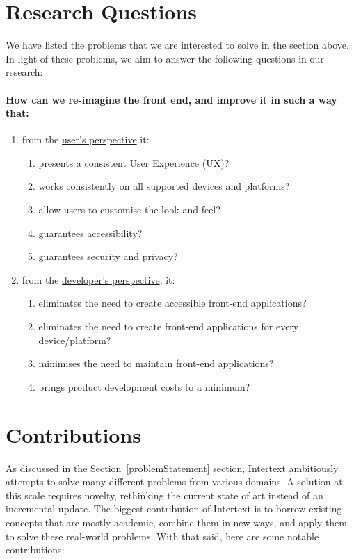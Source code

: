 \section{Research Questions} \label{researchQuestions}

We have listed the problems that we are interested to solve in the section above. In light of these problems, we aim to answer the following questions in our research:

\paragraph{How can we re-imagine the front end, and improve it in such a way that:}
\begin{enumerate}
  \item from the \underline{user's perspective} it:
  \begin{enumerate}
    \item presents a consistent User Experience (UX)?
    \item works consistently on all supported devices and platforms?
    \item allow users to customise the look and feel?
    \item guarantees accessibility?
    \item guarantees security and privacy?
  \end{enumerate}
  \item from the \underline{developer's perspective}, it:
  \begin{enumerate}
    \item eliminates the need to create accessible front-end applications?
    \item eliminates the need to create front-end applications for every device/platform?
    \item minimises the need to maintain front-end applications?
    \item brings product development costs to a minimum?
    
  \end{enumerate}
\end{enumerate}

\section{Contributions} \label{contributions}

As discussed in the Section~\ref{problemStatement} section, Intertext ambitiously attempts to solve many different problems from various domains. A solution at this scale requires novelty, rethinking the current state of art instead of an incremental update. The biggest contribution of Intertext is to borrow existing concepts that are mostly academic, combine them in new ways, and apply them to solve these real-world problems. With that said, here are some notable contributions:


